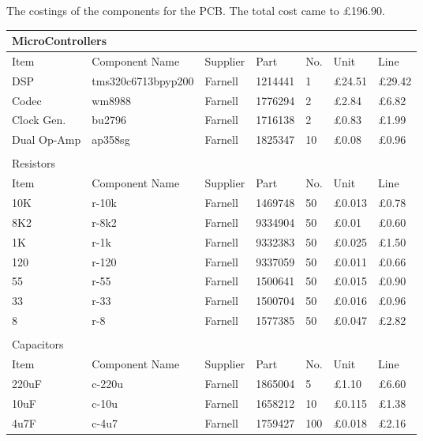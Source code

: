 The costings of the components for the PCB.
The total cost came to \pounds196.90.

\begin{table}[H]
	\centering
	\begin{tabular}[c]{| l | l | l | p{50px} | l | l | l |}
		\hline
		\multicolumn{7}{|l|}{MicroControllers} \\
		\hline
		Item	& Component Name& Supplier & Part	& No.	& Unit  & Line \\
		\hline
		DSP	& tms320c6713bpyp200	& Farnell	& 1214441	& 1	& \pounds24.51	& \pounds29.42	\\
		Codec	& wm8988		& Farnell	& 1776294	& 2	& \pounds2.84	& \pounds6.82	\\
		Clock Gen.	& bu2796	& Farnell	& 1716138	& 2	& \pounds0.83	& \pounds1.99	\\
		Dual Op-Amp	& ap358sg	& Farnell	& 1825347	& 10	& \pounds0.08	& \pounds0.96	\\
		\hline
		\multicolumn{7}{|l|}{}\\
		\hline
		\multicolumn{7}{|l|}{Resistors} \\
		\hline
		Item	& Component Name& Supplier & Part	& No.	& Unit  & Line \\
		\hline
		10K\textohm	& r-10k	& Farnell	& 1469748	& 50	& \pounds0.013	& \pounds0.78	\\
		8K2\textohm	& r-8k2	& Farnell	& 9334904	& 50	& \pounds0.01	& \pounds0.60	\\
		1K\textohm	& r-1k	& Farnell	& 9332383	& 50	& \pounds0.025	& \pounds1.50	\\
		120\textohm	& r-120	& Farnell	& 9337059	& 50	& \pounds0.011	& \pounds0.66	\\
		55\textohm	& r-55	& Farnell	& 1500641	& 50	& \pounds0.015	& \pounds0.90	\\
		33\textohm	& r-33	& Farnell	& 1500704	& 50	& \pounds0.016	& \pounds0.96	\\
		8\textohm	& r-8	& Farnell	& 1577385	& 50	& \pounds0.047	& \pounds2.82	\\
		\hline
		\multicolumn{7}{|l|}{}\\
		\hline
		\multicolumn{7}{|l|}{Capacitors} \\
		\hline
		Item	& Component Name& Supplier & Part	& No.	& Unit  & Line  \\
		\hline
		220uF	& c-220u& Farnell	& 1865004	& 5	& \pounds1.10	& \pounds6.60	\\
		10uF	& c-10u	& Farnell	& 1658212	& 10	& \pounds0.115	& \pounds1.38	\\
		4u7F	& c-4u7	& Farnell	& 1759427	& 100	& \pounds0.018	& \pounds2.16	\\

\end{tabular}
\end{table}
